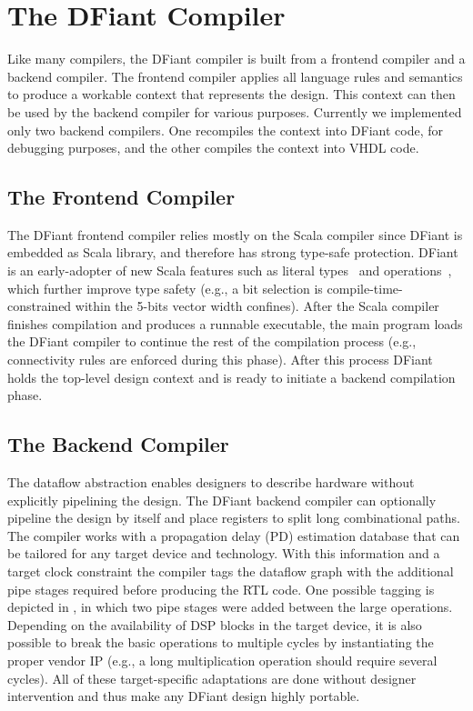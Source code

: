 \section{The DFiant Compiler}
\label{sec:compiler}
Like many compilers, the DFiant compiler is built from a frontend compiler and a backend compiler. The frontend compiler applies all language rules and semantics to produce a workable context that represents the design. This context can then be used by the backend compiler for various purposes. Currently we implemented only two backend compilers. One recompiles the context into DFiant code, for debugging purposes, and the other compiles the context into VHDL code.

\subsection{The Frontend Compiler}
The DFiant frontend compiler relies mostly on the Scala compiler since DFiant is embedded as Scala library, and therefore has strong type-safe protection. DFiant is an early-adopter of new Scala features such as literal types~\cite{TypeLevelScala} and operations~\cite{singleton-ops}, which further improve type safety (e.g., a  bit selection is compile-time-constrained within the 5-bits vector width confines). After the Scala compiler finishes compilation and produces a runnable executable, the main program loads the DFiant compiler to continue the rest of the compilation process (e.g., connectivity rules are enforced during this phase). After this process DFiant holds the top-level design context and is ready to initiate a backend compilation phase. 

\subsection{The Backend Compiler}

The dataflow abstraction enables designers to describe hardware without explicitly pipelining the design. The DFiant backend compiler can optionally pipeline the design by itself and place registers to split long combinational paths. The compiler works with a propagation delay (PD) estimation database that can be tailored for any target device and technology. With this information and a target clock constraint the compiler tags the dataflow graph with the additional pipe stages required before producing the RTL code. One possible tagging is depicted in , in which two pipe stages were added between the large operations. Depending on the availability of DSP blocks in the target device, it is also possible to break the basic operations to multiple cycles by instantiating the proper vendor IP (e.g., a long multiplication operation should require several cycles). All of these target-specific adaptations are done without designer intervention and thus make any DFiant design highly portable.

